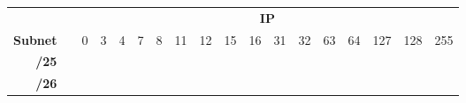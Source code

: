 \documentclass[11pt,a4paper]{report}
\begin{document}
\begin{table}[]
\begin{center}
\begin{tabular}{rlcccccccccccccccc}
\hline
\multicolumn{1}{c}{}                                                                                     & \textbf{}             & \multicolumn{16}{c}{\textbf{IP}}                                                                                                                                                                                                                                                                                                                                                                                                                                                                                  \\ \cline{3-18} 
\multicolumn{1}{c}{\multirow{-2}{*}{\textbf{Subnet}}}                                                    &                       & \cellcolor[HTML]{C09FE5}0 & \cellcolor[HTML]{C09FE5}3 & \cellcolor[HTML]{C09FE5}4 & \cellcolor[HTML]{C09FE5}7 & \cellcolor[HTML]{C09FE5}8 & \cellcolor[HTML]{C09FE5}11 & \cellcolor[HTML]{C09FE5}12 & \cellcolor[HTML]{C09FE5}15 & \cellcolor[HTML]{BFBFBF}16      & \cellcolor[HTML]{BFBFBF}31      & \cellcolor[HTML]{FFD966}32      & \cellcolor[HTML]{FFD966}63      & \cellcolor[HTML]{A9D08E}64      & \cellcolor[HTML]{A9D08E}127     & \cellcolor[HTML]{F4B084}128      & \cellcolor[HTML]{F4B084}255     \\ \cline{1-1} \cline{3-18} 
\textbf{/25}                                                                                             &                       &                           &                           &                           &                           &                           &                            &                            &                            &                                 &                                 &                                 &                                 &                                 &                                 & \cellcolor[HTML]{F4B084}         & \cellcolor[HTML]{F4B084}        \\ \cline{3-18} 
\textbf{/26}                                                                                             &                       &                           &                           &                           &                           &                           &                            &                            &                            &                                 &                                 &                                 &                                 & \cellcolor[HTML]{A9D08E}        & \cellcolor[HTML]{A9D08E}        &                                  &                                 \\ \cline{3-18} 

\end{tabular}
\end{center}
\end{table}
\end{document}
